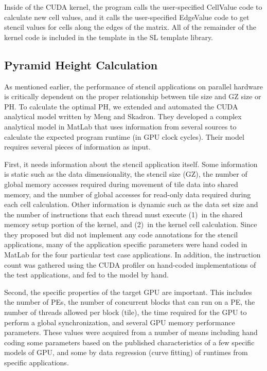 \documentclass[preprint,nocopyrightspace]{styles/sigplanconf}
\begin{document}
Inside of the CUDA kernel, the program calls the user-specified
CellValue code to calculate new cell values, and it calls the
user-specified EdgeValue code to get stencil values for cells along
the edges of the matrix.  All of the remainder of the kernel code is
included in the template in the SL template library.

\subsection{Pyramid Height Calculation}

As mentioned earlier, the performance of stencil applications on parallel
hardware is critically dependent on the proper relationship between tile size
and GZ size or PH.  To calculate the optimal PH, we extended and automated the
CUDA analytical model written by Meng and Skadron.  They developed
a complex analytical model in MatLab that uses information from several sources to
calculate the expected program runtime (in GPU clock cycles).  Their
model requires several pieces of information as input.

First, it needs information about the stencil
application itself.  Some information is static such as the 
data dimensionality, the stencil size (GZ), the number of global
memory accesses required during movement of tile data into shared memory, and
the number of global accesses for read-only data required during each cell
calculation.  Other information is dynamic such as the data set size and
the number of instructions that each thread must execute (1)~in the shared
memory setup portion of the kernel, and (2)~in the kernel cell calculation.
Since they proposed but did not implement any code annotations for the stencil
applications, many of the application specific parameters were hand coded in
MatLab for the four particular test case applications.
In addition, the instruction count was gathered using
the CUDA profiler on hand-coded implementations of the test applications, and
fed to the model by hand.

Second, the specific properties of the target GPU are important.  
This includes the number of PEs, 
the number of concurrent blocks that can run on a PE, the number of threads allowed per block (tile), 
the time required for the GPU to perform a global synchronization, 
and several GPU memory performance parameters.  
These values were acquired from a number of means including hand coding some parameters 
based on the published characteristics of a few specific models of GPU, 
and some by data regression (curve fitting) of runtimes from specific applications.
\end{document}
